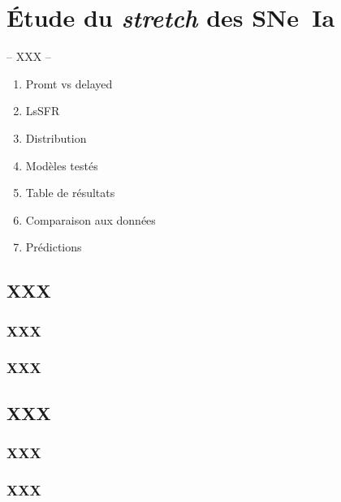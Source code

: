 \documentclass[../main/main.tex]{subfiles}
\begin{document}
\chapter{\'Etude du \textit{stretch} des SNe~Ia}\label{ch:stretch}

-- XXX --

\minitoc
\begin{enumerate}
    \item Promt vs delayed
    \item LsSFR
    \item Distribution
    \item Modèles testés
    \item Table de résultats
    \item Comparaison aux données
    \item Prédictions
\end{enumerate}
\newpage

\section{XXX}

\subsection{XXX}

\subsection{XXX}


\section{XXX}

\subsection{XXX}

\subsection{XXX}
\end{document}
